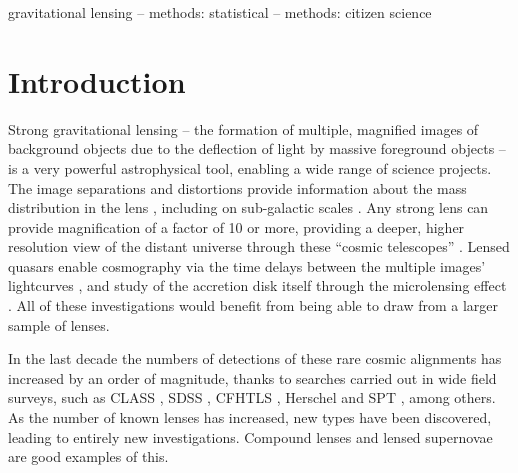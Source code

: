 \documentclass[useAMS,usenatbib,a4paper]{mn2e}
\begin{document}

\begin{keywords}
  gravitational lensing   --
  methods: statistical    --
  methods: citizen science
\end{keywords}

\setcounter{footnote}{1}


\section{Introduction}
\label{sec:intro}


Strong gravitational lensing -- the formation of multiple, magnified images of
background objects due to the deflection of light by  massive foreground
objects -- is a very powerful astrophysical tool, enabling a wide range of
science projects. The image separations and distortions provide information
about the mass distribution in the lens \citep[e.g.][]{AugerEtal2010,
SonnenfeldEtal2012,SonnenfeldEtal2013}, including on sub-galactic scales
\citep[e.g.][]{Dalal+Kochanek2002,VegettiEtal2010,HezavehEtal2013}. Any strong
lens can provide magnification of a factor of 10 or more, providing a deeper,
higher resolution view of the distant universe through these ``cosmic
telescopes'' \citep[e.g.][]{StarkEtal2008,NewtonEtal2011}. Lensed quasars
enable cosmography via the time delays between the multiple images'
lightcurves \citep[e.g.][]{TewesEtal2013,SuyuEtal2013}, and study of the
accretion disk itself through the microlensing effect
\citep[e.g.][]{PoindexterEtal2008}. All of these investigations would
benefit from being able to draw from a larger sample of lenses.

In the last decade the numbers of detections of these rare cosmic alignments
has increased by an order of magnitude, thanks to searches carried out in 
wide field surveys, such as
CLASS \citep[e.g.]{BrowneEtal2003}, SDSS \citep[e.g.][]
{BoltonEtal2006,AugerEtal2010b,TreuEtal2011,InadaEtal2012}, CFHTLS
\citep[e.g.][]{MoreEtal2012,GavazziEtal2014}, Herschel
\citep[][]{NegrelloEtal2014} and SPT \citep[e.g.][]{VieiraEtal2013}, among
others.  As the number of known lenses has increased, new types have been
discovered, leading to entirely new investigations. Compound lenses
\citep{GavazziEtal2008,CollettEtal2012} and lensed supernovae
\citep{QuimbyEtal2014,KellyEtal2014} are good examples of this. 
\end{document}
